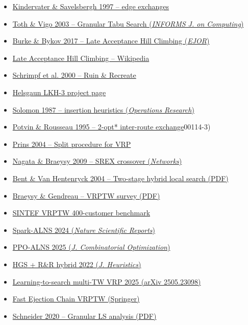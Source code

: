 \documentclass[twocolumn,10pt,letterpaper]{article}
\begin{document}
\begin{itemize}
  \item \href{https://www.sciencedirect.com/science/article/abs/pii/S0167637795003240}{Kindervater \& Savelsbergh 1997 -- edge exchanges}
  \item \href{https://pubsonline.informs.org/doi/10.1287/ijoc.15.4.333.24890}{Toth \& Vigo 2003 -- Granular Tabu Search (\textit{INFORMS J. on Computing})}
  \item \href{https://www.sciencedirect.com/science/article/abs/pii/S0377221716305495}{Burke \& Bykov 2017 -- Late Acceptance Hill Climbing (\textit{EJOR})}
  \item \href{https://en.wikipedia.org/wiki/Late\_acceptance\_hill\_climbing}{Late Acceptance Hill Climbing -- Wikipedia}
  \item \href{https://www.sciencedirect.com/science/article/abs/pii/S0021999199964136}{Schrimpf et al. 2000 -- Ruin \& Recreate}
  \item \href{http://akira.ruc.dk/\textasciitilde{}keld/research/LKH-3/}{Helsgaun LKH-3 project page}
  \item \href{https://pubsonline.informs.org/doi/10.1287/opre.35.2.254}{Solomon 1987 -- insertion heuristics (\textit{Operations Research})}
  \item \href{https://doi.org/10.1016/0377-2217(94}{Potvin \& Rousseau 1995 -- 2-opt* inter-route exchange}00114-3)
  \item \href{https://www.sciencedirect.com/science/article/abs/pii/S0305054803000498}{Prins 2004 -- Split procedure for VRP}
  \item \href{https://doi.org/10.1002/net.20338}{Nagata \& Braeysy 2009 -- SREX crossover (\textit{Networks})}
  \item \href{https://cs.brown.edu/research/pubs/pdfs/2004/Bent-2004-TSH.pdf}{Bent \& Van Hentenryck 2004 -- Two-stage hybrid local search (PDF)}
  \item \href{https://cepac.cheme.cmu.edu/pasi2011/library/cerda/braysy-gendreau-vrp-review.pdf}{Braeysy \& Gendreau -- VRPTW survey (PDF)}
  \item \href{https://www.sintef.no/projectweb/top/vrptw/homberger-benchmark/400-customers/}{SINTEF VRPTW 400-customer benchmark}
  \item \href{https://www.nature.com/articles/s41598-024-74432-2}{Spark-ALNS 2024 (\textit{Nature Scientific Reports})}
  \item \href{https://link.springer.com/article/10.1007/s10878-025-01364-6}{PPO-ALNS 2025 (\textit{J. Combinatorial Optimization})}
  \item \href{https://link.springer.com/article/10.1007/s10732-022-09500-9}{HGS + R\&R hybrid 2022 (\textit{J. Heuristics})}
  \item \href{https://arxiv.org/pdf/2505.23098}{Learning-to-search multi-TW VRP 2025 (arXiv 2505.23098)}
  \item \href{https://link.springer.com/chapter/10.1007/11546245\_8}{Fast Ejection Chain VRPTW (Springer)}
  \item \href{https://logistik.bwl.uni-mainz.de/files/2020/04/dpo\_2020\_03.pdf}{Schneider 2020 -- Granular LS analysis (PDF)}
\end{itemize}


\balance
\end{document}
